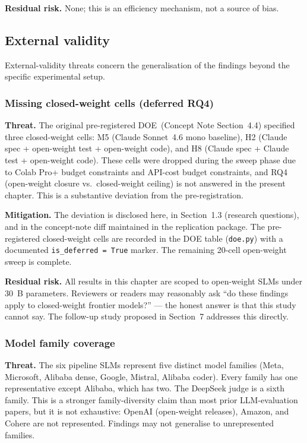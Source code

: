 \textbf{Residual risk.} None; this is an efficiency mechanism, not a source of bias.

\subsection{External validity}
\label{sec:threats_generalisation}

External-validity threats concern the generalisation of the findings beyond the specific experimental setup.

\subsubsection{Missing closed-weight cells (deferred RQ4)}

\textbf{Threat.} The original pre-registered DOE~(Concept Note Section~4.4) specified three closed-weight cells: M5 (Claude Sonnet~4.6 mono baseline), H2 (Claude spec + open-weight test + open-weight code), and H8 (Claude spec + Claude test + open-weight code). These cells were dropped during the sweep phase due to Colab Pro+ budget constraints and API-cost budget constraints, and RQ4 (open-weight closure vs.\ closed-weight ceiling) is not answered in the present chapter. This is a substantive deviation from the pre-registration.

\textbf{Mitigation.} The deviation is disclosed here, in Section~1.3 (research questions), and in the concept-note diff maintained in the replication package. The pre-registered closed-weight cells are recorded in the DOE table (\texttt{doe.py}) with a documented \texttt{is\_deferred = True} marker. The remaining 20-cell open-weight sweep is complete.

\textbf{Residual risk.} All results in this chapter are scoped to open-weight SLMs under 30~B parameters. Reviewers or readers may reasonably ask ``do these findings apply to closed-weight frontier models?'' --- the honest answer is that this study cannot say. The follow-up study proposed in Section~7 addresses this directly.

\subsubsection{Model family coverage}

\textbf{Threat.} The six pipeline SLMs represent five distinct model families (Meta, Microsoft, Alibaba dense, Google, Mistral, Alibaba coder). Every family has one representative except Alibaba, which has two. The DeepSeek judge is a sixth family. This is a stronger family-diversity claim than most prior LLM-evaluation papers, but it is not exhaustive: OpenAI (open-weight releases), Amazon, and Cohere are not represented. Findings may not generalise to unrepresented families.

